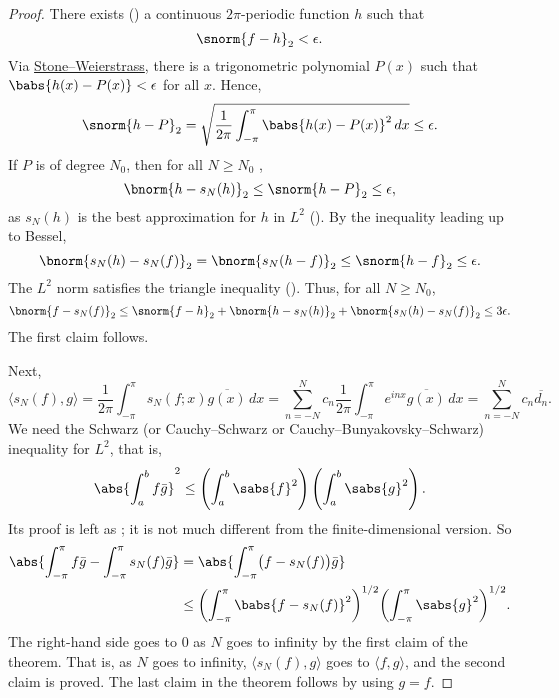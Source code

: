 \begin{proof}
There exists ()
a continuous $2\pi$-periodic function $h$ such that
\begin{equation*}
\snorm{f-h}_2 < \epsilon .
\end{equation*}
Via \hyperref[thm:SWcomplex]{Stone--Weierstrass},
there is a trigonometric polynomial $P(x)$
such that
$\babs{h(x) - P(x)} < \epsilon$ for all $x$.
Hence,
\begin{equation*}
\snorm{h-P}_2
=
\sqrt{
\frac{1}{2\pi}
\int_{-\pi}^{\pi}
\babs{h(x)-P(x)}^2
\,
dx
}
\leq \epsilon.
\end{equation*}
If $P$ is of degree $N_0$, then for all $N \geq N_0$ ,
\begin{equation*}
\bnorm{h-s_N(h)}_2 \leq \snorm{h-P}_2 \leq \epsilon ,
\end{equation*}
as $s_N(h)$ is the best approximation for $h$ in $L^2$ ().
By the inequality leading up to Bessel,
\begin{equation*}
\bnorm{s_N(h)-s_N(f)}_2
=
\bnorm{s_N(h-f)}_2
\leq
\snorm{h-f}_2 \leq \epsilon .
\end{equation*}
The $L^2$ norm satisfies the triangle inequality
().
Thus, for all $N \geq N_0$,
\begin{equation*}
\bnorm{f-s_N(f)}_2
\leq
\snorm{f-h}_2
+
\bnorm{h-s_N(h)}_2
+
\bnorm{s_N(h)-s_N(f)}_2
\leq 3\epsilon .
\end{equation*}
The first claim follows.

Next,
\begin{equation*}
\langle s_N(f) , g \rangle
=
\frac{1}{2\pi}
\int_{-\pi}^\pi
s_N(f;x) \overline{g(x)} \, dx
=
\sum_{n=-N}^N
c_n 
\frac{1}{2\pi}
\int_{-\pi}^\pi
e^{inx}
\overline{g(x)} \, dx
=
\sum_{n=-N}^N
c_n 
\overline{d_n} .
\end{equation*}
We need the Schwarz (or Cauchy--Schwarz or Cauchy--Bunyakovsky--Schwarz)
inequality for $L^2$, that is,
\begin{equation*}
{\abs{\int_a^b f\bar{g}}}^2
\leq
\left( \int_a^b \sabs{f}^2 \right)
\left( \int_a^b \sabs{g}^2 \right) .
\end{equation*}
Its proof is left as ;
it is not much
different from the finite-dimensional version.
So
\begin{equation*}
\begin{split}
\abs{\int_{-\pi}^\pi f\bar{g} - \int_{-\pi}^\pi s_N(f)\bar{g}}
& =
\abs{\int_{-\pi}^\pi \bigl(f- s_N(f)\bigr)\bar{g}} \\
& \leq
{\left(\int_{-\pi}^\pi \babs{f- s_N(f)}^2 \right)}^{1/2}
{\left( \int_{-\pi}^\pi \sabs{g}^2 \right)}^{1/2} .
\end{split}
\end{equation*}
The right-hand side goes to 0 as $N$ goes to infinity by the first
claim of the theorem.
That is, as $N$ goes to infinity, $\langle s_N(f),g \rangle$
goes to $\langle f,g \rangle$, and
the second claim is proved.  The last claim in the theorem follows by using
$g=f$.
\end{proof}


